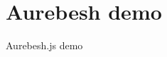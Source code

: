 \documentclass[aspectratio=169]{beamer}
\newcommand{\supertext}[1]{\fontsize{30}{40}\selectfont #1}
\begin{document}
\section*{Aurebesh demo}
\begin{frame}
	\centering
	\vfill
	\supertext{Aurebesh.js demo}
	\vfill
\end{frame}

%
%
%
\end{document}
